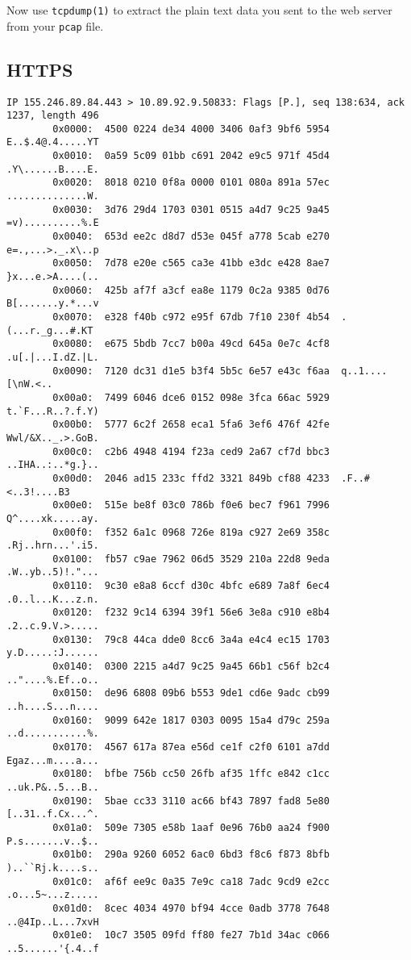 \documentclass[xga]{xdvislides}
\begin{document}
Now use {\tt tcpdump(1)} to extract the plain text data you sent
to the web server from your {\tt pcap} file.

\subsection{HTTPS}
\small
\begin{verbatim}
IP 155.246.89.84.443 > 10.89.92.9.50833: Flags [P.], seq 138:634, ack 1237, length 496
        0x0000:  4500 0224 de34 4000 3406 0af3 9bf6 5954  E..$.4@.4.....YT
        0x0010:  0a59 5c09 01bb c691 2042 e9c5 971f 45d4  .Y\......B....E.
        0x0020:  8018 0210 0f8a 0000 0101 080a 891a 57ec  ..............W.
        0x0030:  3d76 29d4 1703 0301 0515 a4d7 9c25 9a45  =v)..........%.E
        0x0040:  653d ee2c d8d7 d53e 045f a778 5cab e270  e=.,...>._.x\..p
        0x0050:  7d78 e20e c565 ca3e 41bb e3dc e428 8ae7  }x...e.>A....(..
        0x0060:  425b af7f a3cf ea8e 1179 0c2a 9385 0d76  B[.......y.*...v
        0x0070:  e328 f40b c972 e95f 67db 7f10 230f 4b54  .(...r._g...#.KT
        0x0080:  e675 5bdb 7cc7 b00a 49cd 645a 0e7c 4cf8  .u[.|...I.dZ.|L.
        0x0090:  7120 dc31 d1e5 b3f4 5b5c 6e57 e43c f6aa  q..1....[\nW.<..
        0x00a0:  7499 6046 dce6 0152 098e 3fca 66ac 5929  t.`F...R..?.f.Y)
        0x00b0:  5777 6c2f 2658 eca1 5fa6 3ef6 476f 42fe  Wwl/&X.._.>.GoB.
        0x00c0:  c2b6 4948 4194 f23a ced9 2a67 cf7d bbc3  ..IHA..:..*g.}..
        0x00d0:  2046 ad15 233c ffd2 3321 849b cf88 4233  .F..#<..3!....B3
        0x00e0:  515e be8f 03c0 786b f0e6 bec7 f961 7996  Q^....xk.....ay.
        0x00f0:  f352 6a1c 0968 726e 819a c927 2e69 358c  .Rj..hrn...'.i5.
        0x0100:  fb57 c9ae 7962 06d5 3529 210a 22d8 9eda  .W..yb..5)!."...
        0x0110:  9c30 e8a8 6ccf d30c 4bfc e689 7a8f 6ec4  .0..l...K...z.n.
        0x0120:  f232 9c14 6394 39f1 56e6 3e8a c910 e8b4  .2..c.9.V.>.....
        0x0130:  79c8 44ca dde0 8cc6 3a4a e4c4 ec15 1703  y.D.....:J......
        0x0140:  0300 2215 a4d7 9c25 9a45 66b1 c56f b2c4  .."....%.Ef..o..
        0x0150:  de96 6808 09b6 b553 9de1 cd6e 9adc cb99  ..h....S...n....
        0x0160:  9099 642e 1817 0303 0095 15a4 d79c 259a  ..d...........%.
        0x0170:  4567 617a 87ea e56d ce1f c2f0 6101 a7dd  Egaz...m....a...
        0x0180:  bfbe 756b cc50 26fb af35 1ffc e842 c1cc  ..uk.P&..5...B..
        0x0190:  5bae cc33 3110 ac66 bf43 7897 fad8 5e80  [..31..f.Cx...^.
        0x01a0:  509e 7305 e58b 1aaf 0e96 76b0 aa24 f900  P.s.......v..$..
        0x01b0:  290a 9260 6052 6ac0 6bd3 f8c6 f873 8bfb  )..``Rj.k....s..
        0x01c0:  af6f ee9c 0a35 7e9c ca18 7adc 9cd9 e2cc  .o...5~...z.....
        0x01d0:  8cec 4034 4970 bf94 4cce 0adb 3778 7648  ..@4Ip..L...7xvH
        0x01e0:  10c7 3505 09fd ff80 fe27 7b1d 34ac c066  ..5......'{.4..f
\end{verbatim}
\Normalsize
\end{document}
